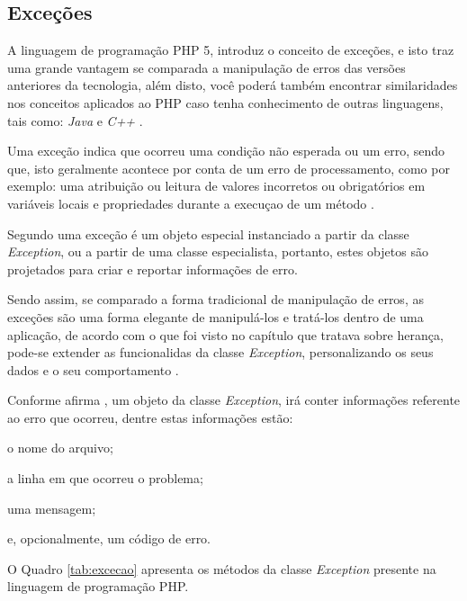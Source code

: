 \subsection{Exceções}

A linguagem de programação \acs{PHP} 5, introduz o conceito de exceções, e isto traz
uma grande vantagem se comparada a manipulação de erros das versões anteriores
da tecnologia, além disto, você poderá também encontrar similaridades nos
conceitos aplicados ao \acs{PHP} caso tenha conhecimento de outras linguagens, tais
como: \textit{Java} e \textit{C++} \cite{phpObjectsPatternsAndPractice}.

Uma exceção indica que ocorreu uma condição não esperada ou um erro, sendo que,
isto geralmente acontece por conta de um erro de processamento, como por
exemplo: uma atribuição ou leitura de valores incorretos ou obrigatórios em
variáveis locais e propriedades durante a execuçao de um método \cite{learningJava}.

Segundo  uma exceção é um objeto
especial instanciado a partir da classe \textit{Exception}, ou a partir de uma
classe especialista, portanto, estes objetos são projetados para criar e
reportar informações de erro.

Sendo assim, se comparado a forma tradicional de manipulação de erros, as
exceções são uma forma elegante de manipulá-los e tratá-los dentro de uma
aplicação, de acordo com o que foi visto no capítulo que
tratava sobre herança, pode-se extender as funcionalidas da classe
\textit{Exception}, personalizando os seus dados e o seu comportamento \cite{phpMasterWriteCuttingEdgeCode}.

Conforme afirma , um objeto da classe
\textit{Exception}, irá conter informações referente ao erro que ocorreu, dentre
estas informações estão:

\begin{alineas}
    \item o nome do arquivo;
    \item a linha em que ocorreu o problema;
    \item uma mensagem;
    \item e, opcionalmente, um código de erro.
\end{alineas}

O Quadro \ref{tab:excecao} apresenta os métodos da classe \textit{Exception}
presente na linguagem de programação \acs{PHP}.


